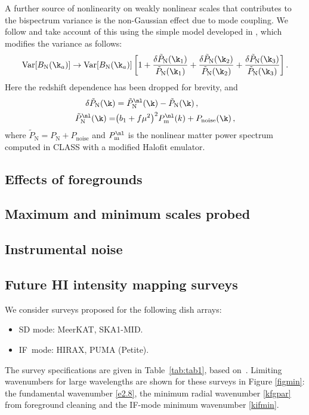 A further source of nonlinearity on weakly nonlinear scales that contributes to the bispectrum variance  is the non-Gaussian effect due to mode coupling. We follow \cite{Karagiannis:2018jdt,Maartens:2019yhx} and  take account of this using the simple model developed in \cite{Chan:2016ehg}, which modifies the variance as follows: 
\begin{equation}
\mathrm{Var} [{B_{\mathrm N}}(\k_a)]  \to  \mathrm{Var}  [{B_{\mathrm N}}(\k_a)] \left[1+  
\frac{\delta\tilde{P}_{\mathrm N}(\k_1)}{\tilde{P}_{\mathrm N}(\k_1)} + \frac{\delta\tilde{P}_{\mathrm N}(\k_2)}{\tilde{P}_{\mathrm N}(\k_2)} + \frac{\delta\tilde{P}_{\mathrm N}(\k_3)}{\tilde{P}_{\mathrm N}(\k_3)}\right]  .
 \label{eq:e2.14}
\end{equation}
 Here the redshift dependence  has been dropped for brevity, and
\begin{align}
\delta\tilde{P}_{\mathrm N}(\k) & = \tilde{P}_{\mathrm N}^{\nl}(\k) - \tilde{P}_{\mathrm N}(\k)\,, 
\label{eq:e2.15}\\
\tilde{P}^{\nl}_{\mathrm N}(\k) =& \big(b_{1}+f\mu^2\big)^2P^{\nl}_{\mathrm m}(k)+P_\mathrm{noise}(\k)\,,\label{e2.15_1}
\end{align}
where $\tilde{P}_{\mathrm N}={P}_{\mathrm N}+P_\mathrm{noise}$ and
$P^{\nl}_{\mathrm m}$ is the nonlinear matter power spectrum computed in CLASS with a modified Halofit emulator.
%
%
\subsection{Effects of foregrounds}
%
\subsection{Maximum and minimum scales probed}
%
\subsection{Instrumental noise}
%
\subsection{Future HI intensity mapping surveys}
%
We consider surveys proposed for the following dish arrays:
\begin{itemize}
\item 
SD mode:  MeerKAT, 
SKA1-MID.
\item
IF\ mode: HIRAX,
PUMA (Petite). 
\end{itemize}
The survey specifications are given in Table~\ref{tab:tab1}, {based on~\cite{Santos:2017qgq, Bacon:2018dui, Slosar:2019jwd,Karagiannis:2019jjx,Castorina:2020zhz}}. {Limiting wavenumbers for large wavelengths  are shown for these surveys in Figure \ref{figmin}: the
fundamental wavenumber \eqref{e2.8}, the minimum radial wavenumber \eqref{kfgpar} from foreground cleaning and the IF-mode minimum wavenumber \eqref{kifmin}.}

